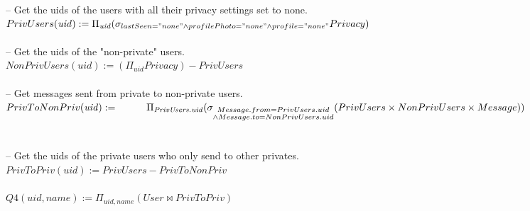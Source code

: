 \documentclass{article}
\newcommand{\var}[1]{\mathit{#1}}
\begin{document}
\begin{enumerate}
{\large
\hspace*{1cm} -- Get the uids of the users with all their privacy settings set to none. \\ [5pt]
$
PrivUsers(\var{uid}) := 
	\Pi_{\var{uid}}
	(\sigma_{lastSeen = "none" \\
			\wedge profilePhoto = "none" \\
			\wedge profile = "none"} Privacy)
$ \\\\
\hspace*{1cm} -- Get the uids of the "non-private" users. \\ [5pt]
$
NonPrivUsers(\var{uid}) :=
	(\Pi_{\var{uid}} Privacy) - PrivUsers
$ \\\\
\hspace*{1cm} -- Get messages sent from private to non-private users.	 \\ [5pt]
$
PrivToNonPriv(\var{uid}) := \\
	\hspace*{1cm}
	\Pi_{\var{PrivUsers.uid}}
	(\sigma_{\substack{Message.from = PrivUsers.uid \\
		 \wedge Message.to = NonPrivUsers.uid}}
		(PrivUsers \times NonPrivUsers \times Message))	
$ \\	\\\\
\hspace*{1cm} -- Get the uids of the private users who only send to other privates. \\ [5pt]
$
PrivToPriv(\var{uid}) :=
	PrivUsers - PrivToNonPriv
$ \\\\
$
Q4(\var{uid}, name) :=
	\Pi_{\var{uid}, \var{name}} (User \bowtie PrivToPriv)
$ \\\\


}


\end{enumerate}
\end{document}
